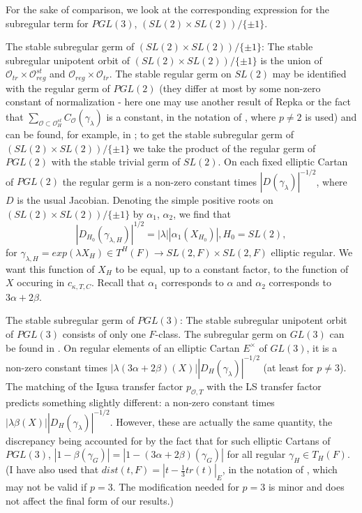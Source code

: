 \documentclass[12pt,letterpaper]{amsart}
\begin{document}
\iffalse
For the sake of comparison, we look at
the corresponding expression for the subregular
term for $PGL(3)$, $(SL(2)\times SL(2))/\{\pm 1\}$.

The stable subregular germ of $(SL(2)\times SL(2))/\{\pm 1\}$:
The stable subregular
unipotent orbit of $(SL(2)\times SL(2))/\{\pm 1\}$ is the union of
${\mathcal O}_{tr}\times {\mathcal O}_{reg}^{st}$ and
${\mathcal O}_{reg}\times {\mathcal O}_{tr}$. The stable regular germ on $SL(2)$
may be identified with the regular germ of $PGL(2)$ (they differ
at most by some non-zero constant of normalization -
here one may use another result of Repka or the fact that
$\sum_{{\mathcal O}\subset {\mathcal O}_H^{st}}C_{\mathcal O}(\gamma_\lambda)$
is a constant, in the notation of \cite[Lemma 2.4]{SS83},
where $p\not= 2$ is used) and
can be found, for example, in \cite{SS83}; to get the stable
subregular germ of $(SL(2)\times SL(2))/\{\pm 1\}$ we take the product of
the regular germ of $PGL(2)$ with the stable trivial germ of $SL(2)$.
On each fixed
elliptic Cartan of $PGL(2)$ the regular germ is a non-zero constant
times $|D(\gamma_\lambda)|^{-1/2}$, where $D$ is the usual Jacobian.
Denoting the simple positive roots on $(SL(2)\times SL(2))/\{\pm 1\}$
by $\alpha_1$, $\alpha_2$, we find that
\[
|D_{H_0}(\gamma_{\lambda,H})|^{1/2}=
|\lambda||\alpha_1(X_{H_0})|, H_0=SL(2),
\tag{6.6}
\]
for $\gamma_{\lambda,H}=exp(\lambda X_H)\in T^H(F)\rightarrow
SL(2,F)\times SL(2,F)$ elliptic regular. We want this function of $X_H$
to be equal, up to a constant factor, to the function of $X$ occuring
in $c_{\kappa, T,C}$. Recall that $\alpha_1$ corresponds to $\alpha$ and
$\alpha_2$ corresponds to $3\alpha +2\beta$.

The stable subregular germ of $PGL(3)$: The stable subregular
unipotent orbit of
$PGL(3)$ consists of only one $F$-class. The subregular germ on $GL(3)$
can be found in \cite{Re84}. On  regular elements of an
elliptic Cartan $E^{\times}$ of $GL(3)$, it is a non-zero constant
times $|\lambda (3\alpha +2\beta)(X)||D_H(\gamma_\lambda)|^{-1/2}$
(at least for $p\not= 3$). The matching of the Igusa transfer factor
$p_{{\mathcal O},T}$ with the LS transfer factor predicts something slightly
different: a non-zero constant times
$|\lambda \beta(X)||D_H(\gamma_\lambda)|^{-1/2}$. However, these are
actually the same quantity, the discrepancy being accounted for by
the fact that for such elliptic Cartans of $PGL(3)$,
$|1-\beta(\gamma_G)|=|1-(3\alpha +2\beta)(\gamma_G)|$
for all regular $\gamma_H\in T_H(F)$.
(I have also used that
$dist(t,F)=|t-\frac{1}{3}tr(t)|_E$, in the notation of \cite{Re84},
which may not be valid if $p=3$. The modification needed for
$p=3$ is minor and does not affect the final form of our results.)
\end{document}
